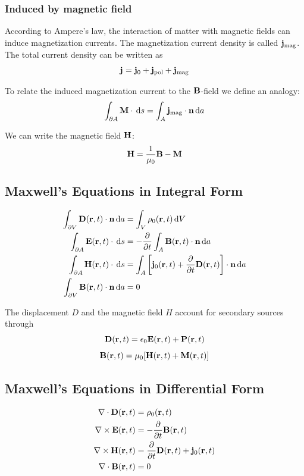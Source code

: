 \documentclass[a4paper, fontsize=8pt, landscape, DIV=1]{scrartcl}
\begin{document}
\begin{multicols*}{4}
  \subsubsection{Induced by magnetic field}
  According to Ampere's law, the interaction of matter with magnetic fields can induce magnetization currents. The magnetization current density is called $\mathbf{j}_\text{mag}$. The total current density can be written as
  \[\mathbf{j}_\text{} = \mathbf{j}_\text{0} + \mathbf{j}_\text{pol} + \mathbf{j}_\text{mag}\]

  To relate the induced magnetization current to the $\mathbf{B}$-field we define an analogy:
  \[\int_{\partial A}\mathbf{M}\cdot\,\mathrm{d} s= \int_A \mathbf{j}_\text{mag}\cdot \mathbf{n} \,\mathrm{d} a\]

  We can write the magnetic field $\mathbf{H}$:
  \[\mathbf{H}=\frac{1}{\mu_0}\mathbf{B}-\mathbf{M}\]

  \subsection{Maxwell's Equations in Integral Form}
  \begin{align*}
    \int_{\partial V} \mathbf{D}(\mathbf{r},t) \cdot\mathbf{n}\,\mathrm{d} a &= \int_V \rho_0(\mathbf{r},t) \,\mathrm{d} V \\
    \int_{\partial A} \mathbf{E}(\mathbf{r},t) \cdot \,\mathrm{d} s &= -\frac{\partial}{\partial t}\int_A \mathbf{B}(\mathbf{r},t) \cdot \mathbf{n} \,\mathrm{d} a \\
    \int_{\partial A} \mathbf{H}(\mathbf{r},t) \cdot \,\mathrm{d} s &= \int_A \left[\mathbf{j}_0(\mathbf{r},t) + \frac{\partial}{\partial t}\mathbf{D}(\mathbf{r},t)\right] \cdot \mathbf{n} \,\mathrm{d} a \\
    \int_{\partial V} \mathbf{B}(\mathbf{r},t) \cdot \mathbf{n} \,\mathrm{d} a &= 0
  \end{align*}

  The displacement $D$ and the magnetic field $H$ account for secondary sources through
  \[\mathbf{D}(\mathbf{r},t) = \epsilon_0 \mathbf{E}(\mathbf{r},t)+\mathbf{P}(\mathbf{r},t)\]
  \[ \mathbf{B}(\mathbf{r},t) = \mu_0 [\mathbf{H}(\mathbf{r},t) + \mathbf{M}(\mathbf{r},t)]\]

  \subsection{Maxwell's Equations in Differential Form}
  \begin{align*}
    \nabla \cdot \mathbf{D}(\mathbf{r},t) &= \rho_0(\mathbf{r},t) \\
    \nabla\times \mathbf{E}(\mathbf{r},t) &= -\frac{\partial}{\partial t}\mathbf{B}(\mathbf{r},t) \\
    \nabla\times \mathbf{H}(\mathbf{r},t) &= \frac{\partial}{\partial t}\mathbf{D}(\mathbf{r},t) + \mathbf{j}_0(\mathbf{r},t)\\
    \nabla \cdot \mathbf{B}(\mathbf{r},t) &= 0
  \end{align*}


\end{multicols*}
\end{document}
